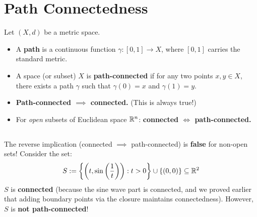 \hrulefill

\section{Path Connectedness}

\begin{definition*}
Let $(X, d)$ be a metric space. 
\begin{itemize}
    \item A \textbf{path} is a continuous function $\gamma: [0,1] \to X$, where $[0,1]$ carries the standard metric.
    \item A space (or subset) $X$ is \textbf{path-connected} if for any two points $x, y \in X$, there exists a path $\gamma$ such that $\gamma(0) = x$ and $\gamma(1) = y$.
\end{itemize}
\end{definition*}

\begin{proposition*}
\begin{itemize}
    \item \textbf{Path-connected $\implies$ connected.} (This is always true!)
    \item For \emph{open} subsets of Euclidean space $\mathbb{R}^n$: \textbf{connected $\iff$ path-connected.}
\end{itemize}
\end{proposition*}

\subsection*{}
The reverse implication (connected $\implies$ path-connected) is \textbf{false} for non-open sets! Consider the set:
\[ S := \left\{ \left(t, \sin\left(\frac{1}{t}\right)\right) : t > 0 \right\} \cup \left\{ (0,0) \right\} \subseteq \mathbb{R}^2 \]
$S$ is \textbf{connected} (because the sine wave part is connected, and we proved earlier that adding boundary points via the closure maintains connectedness). However, $S$ is \textbf{not path-connected}!



